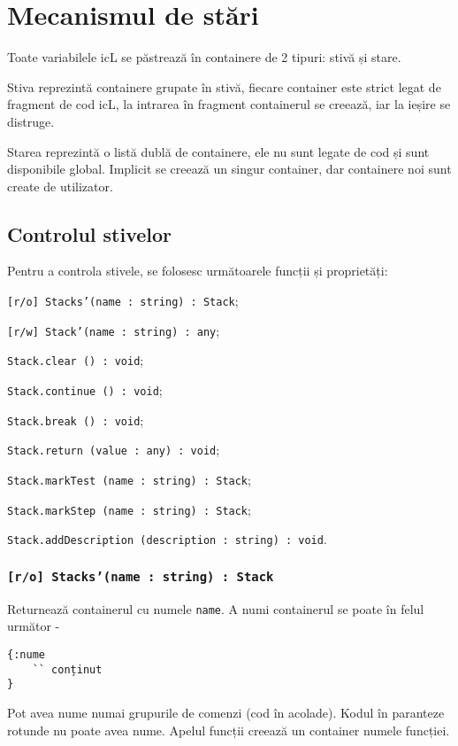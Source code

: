 \section{Mecanismul de stări}

Toate variabilele icL se păstrează în containere de 2 tipuri: stivă și stare.

Stiva reprezintă containere grupate în stivă, fiecare container este strict legat de fragment de cod icL, la intrarea în fragment containerul se creează, iar la ieșire se distruge.

Starea reprezintă o listă dublă de containere, ele nu sunt legate de cod și sunt disponibile global. Implicit se creează un singur container, dar containere noi sunt create de utilizator.

\subsection{Controlul stivelor}
\label{stack:control}

Pentru a controla stivele, se folosesc următoarele funcții și proprietăți:
\begin{icItems}
	\item \texttt{[r/o] Stacks'(name : string) : Stack};
	\item \texttt{[r/w] Stack'(name : string) : any};
	\item \texttt{Stack.clear () : void};
	\item \texttt{Stack.continue () : void};
	\item \texttt{Stack.break () : void};
	\item \texttt{Stack.return (value : any) : void};
	\item \texttt{Stack.markTest (name : string) : Stack};
	\item \texttt{Stack.markStep (name : string) : Stack};
	\item \texttt{Stack.addDescription (description : string) : void}.
\end{icItems}

\subsubsection{\texttt{[r/o] Stacks'(name : string) : Stack}}

Returnează containerul cu numele \texttt{name}. A numi containerul se poate în felul următor -
\begin{verbatim}
{:nume
	`` conținut
}
\end{verbatim}
Pot avea nume numai grupurile de comenzi (cod în acolade). Kodul în paranteze rotunde nu poate avea nume. Apelul funcții creează un container numele funcției.


